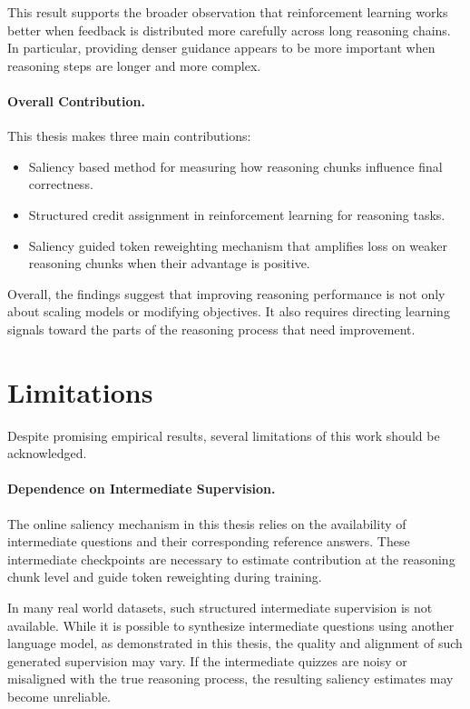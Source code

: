\documentclass[12pt]{report}
\begin{document}
This result supports the broader observation that reinforcement learning works better when feedback is distributed more carefully across long reasoning chains. In particular, providing denser guidance appears to be more important when reasoning steps are longer and more complex.

\paragraph{Overall Contribution.}
This thesis makes three main contributions:

\begin{itemize}
    \item Saliency based method for measuring how reasoning chunks influence final correctness.
    \item Structured credit assignment in reinforcement learning for reasoning tasks.
    \item Saliency guided token reweighting mechanism that amplifies loss on weaker reasoning chunks when their advantage is positive.
\end{itemize}

Overall, the findings suggest that improving reasoning performance is not only about scaling models or modifying objectives. It also requires directing learning signals toward the parts of the reasoning process that need improvement.

\section{Limitations}

Despite promising empirical results, several limitations of this work should be acknowledged.

\paragraph{Dependence on Intermediate Supervision.}
The online saliency mechanism in this thesis relies on the availability of intermediate questions and their corresponding reference answers. These intermediate checkpoints are necessary to estimate contribution at the reasoning chunk level and guide token reweighting during training. 

In many real world datasets, such structured intermediate supervision is not available. While it is possible to synthesize intermediate questions using another language model, as demonstrated in this thesis, the quality and alignment of such generated supervision may vary. If the intermediate quizzes are noisy or misaligned with the true reasoning process, the resulting saliency estimates may become unreliable.
\end{document}
